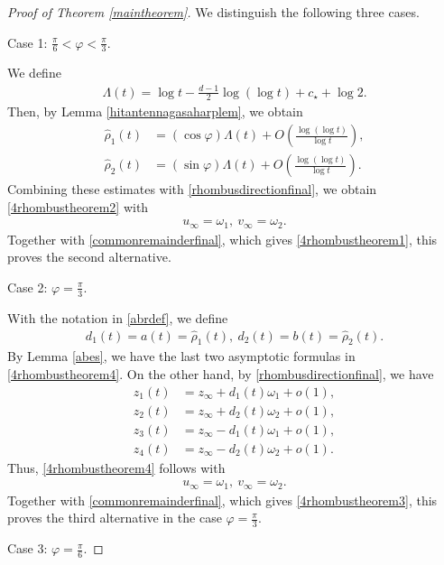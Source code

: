 \documentclass[10pt,a4paper]{amsart}
\numberwithin{equation}{section}
\begin{document}
\begin{proof}[Proof of Theorem \ref{maintheorem}]
We distinguish the following three cases.


Case 1: $\frac{\pi}{6}<\varphi<\frac{\pi}{3}$.

We define 
\begin{align*}
\Lambda(t)=\log{t}-\frac{d-1}{2}\log{(\log{t})}+c_{\star}+\log{2}.
\end{align*}
Then, by Lemma \ref{hitantennagasaharplem}, we obtain
\begin{align*}
\hat{\rho}_1(t)&=\left(\cos\varphi\right)\Lambda(t)+O\left(\frac{\log(\log t)}{\log t}\right),
\\
\hat{\rho}_2(t)&=\left(\sin\varphi\right)\Lambda(t)+O\left(\frac{\log(\log t)}{\log t}\right).
\end{align*}
Combining these estimates with \eqref{rhombusdirectionfinal}, we obtain \eqref{4rhombustheorem2} with
\begin{align*}
u_{\infty}=\omega_1,\ v_{\infty}=\omega_2.
\end{align*}
Together with \eqref{commonremainderfinal}, which gives \eqref{4rhombustheorem1}, this proves the second alternative.


Case 2: $\varphi=\frac{\pi}{3}$.

With the notation in \eqref{abrdef}, we define
\begin{align*}
d_1(t)=a(t)=\hat{\rho}_1(t),\ d_2(t)=b(t)=\hat{\rho}_2(t).
\end{align*}
By Lemma \ref{abes}, we have the last two asymptotic formulas in \eqref{4rhombustheorem4}. On the other hand,
by \eqref{rhombusdirectionfinal}, we have
\begin{align*}
z_1(t)&=z_{\infty}+d_1(t)\omega_1+o(1),
\\
 z_2(t)&=z_{\infty}+d_2(t)\omega_2+o(1),
\\
z_3(t)&=z_{\infty}-d_1(t)\omega_1+o(1),
\\
z_4(t)&=z_{\infty}-d_2(t)\omega_2+o(1).
\end{align*}
Thus, \eqref{4rhombustheorem4} follows with
\begin{align*}
u_{\infty}=\omega_1,\ v_{\infty}=\omega_2.
\end{align*}
Together with \eqref{commonremainderfinal}, which gives \eqref{4rhombustheorem3}, this proves the third alternative in the
case $\varphi=\frac{\pi}{3}$.

Case 3: $\varphi=\frac{\pi}{6}$.



\end{proof}
\end{document}
